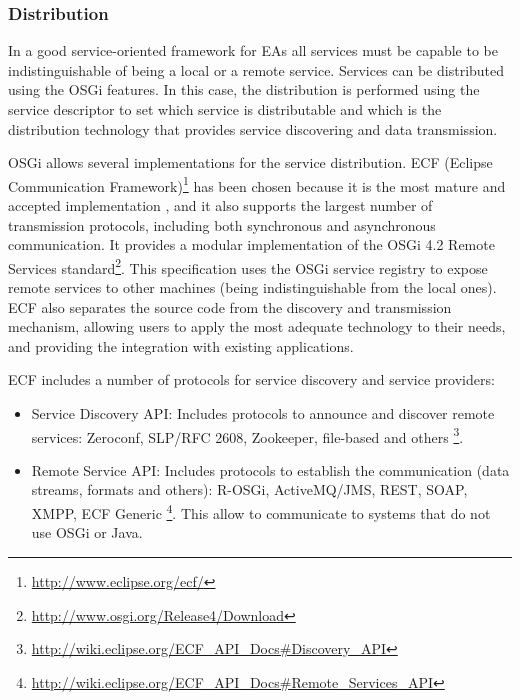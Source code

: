 \subsubsection{Distribution}
In a good service-oriented framework for EAs all services must be capable to be indistinguishable of being a local or a remote service. Services can be distributed using the OSGi features. In this case, the distribution is performed using the service descriptor to set which service is distributable and which is the distribution technology that provides service discovering and data transmission.

OSGi allows several implementations for the service distribution. ECF (Eclipse Communication Framework)\footnote{\url{http://www.eclipse.org/ecf/}} has been chosen because it is the most mature and accepted implementation \cite{petzold2011dynamic}, and it also supports the largest number of transmission protocols, including both synchronous and asynchronous communication. It provides a modular implementation of the OSGi 4.2 Remote Services standard\footnote{\url{http://www.osgi.org/Release4/Download}}. This specification uses the OSGi service registry to expose remote services to other machines (being indistinguishable from the local ones). ECF also separates the source code from the discovery and transmission mechanism, allowing users to apply the most adequate technology to their needs, and providing the integration with existing applications. %

ECF includes a number of protocols for service discovery and service providers:
\begin{itemize}
\item Service Discovery API: Includes protocols to announce and discover remote services: Zeroconf, SLP/RFC 2608, Zookeeper, file-based and others \footnote{\url{http://wiki.eclipse.org/ECF_API_Docs\#Discovery_API}}.
\item Remote Service API: Includes protocols to establish the communication (data streams, formats and others): R-OSGi, ActiveMQ/JMS, REST, SOAP, XMPP, ECF Generic \footnote{\url{http://wiki.eclipse.org/ECF_API_Docs\#Remote_Services_API}}. This allow to communicate to systems that do not use OSGi or Java.
\end{itemize}

